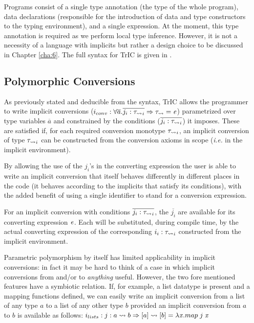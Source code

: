 Programs consist of a single type annotation (the type of the whole program), data declarations (responsible for the introduction of data and type constructors to the typing environment), and a single expression. At the moment, this type annotation is required as we perform local type inference. However, it is not a necessity of a language with implicits but rather a design choice to be discussed in Chapter \ref{cha:6}. The full syntax for TrIC is given in .

\subsection{Polymorphic Conversions}
\label{polymorphic conversions}
As previously stated and deducible from the syntax, TrIC allows the programmer to write implicit conversions ($i_{conv} : \forall \overline{a}.\overline{j_i : \mathit{\tau_{\rightsquigarrow}}_i} \Rightarrow \mathit{\tau_{\rightsquigarrow}} = \mathit{e}$) parametrized over type variables $\overline{a}$  and constrained by the conditions ($\overline{j_i : \mathit{\tau_{\rightsquigarrow}}_i}$) it imposes. These are satisfied if, for each required conversion monotype $\mathit{\tau_{\rightsquigarrow}}_i$, an implicit conversion of type $\mathit{\tau_{\rightsquigarrow}}_i$ can be constructed from the conversion axioms in scope (\textit{i.e.} in the implicit environment).

By allowing the use of the $j_i$'s in the converting expression the user is able to write an implicit conversion that itself behaves differently in different places in the code (it behaves according to the implicits that satisfy its conditions), with the added benefit of using a single identifier to stand for a conversion expression.

For an implicit conversion with conditions $\overline{j_i : \mathit{\tau_{\rightsquigarrow}}_i}$, the $\overline{j_i}$ are available for its converting expression $\mathit{e}$. Each will be substituted, during compile time, by the actual converting expression of the corresponding $i_i:\mathit{\tau_{\rightsquigarrow}}_i$ constructed from the implicit environment.

Parametric polymorphism by itself has limited applicability in implicit conversions: in fact it may be hard to think of a case in which implicit conversions from and/or to \textit{anything} useful. However, the two fore mentioned features have a symbiotic relation. If, for example, a list datatype is present and a mapping functions defined, we can easily write an implicit conversion from a list of any type $a$ to a list of any other type $b$ provided an implicit conversion from $a$ to $b$ is available as follows: $i_{lists}: j: a \rightsquigarrow b \Rightarrow [a] \rightsquigarrow [b] = \lambda \mathit{x} . map\;j\;\mathit{x}$

